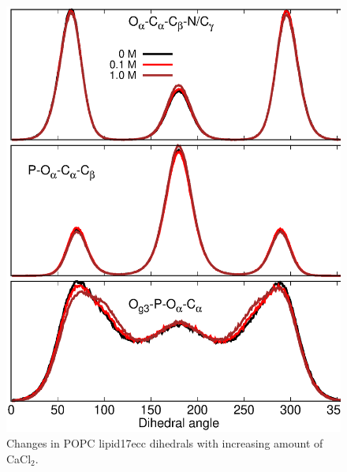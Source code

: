 \documentclass[journal=jpcbfk]{achemso}
\begin{document}
\begin{figure}[]
  \centering
  \includegraphics[width=12.0cm]{./Figs/DIHEDRALSlipid17eccWITHCaClPOPC.eps}
  \caption{\label{DIHSwithCAlipid17eccPOPC}
    Changes in POPC lipid17ecc dihedrals with increasing amount of CaCl$_2$.
  }
\end{figure}
\end{document}
